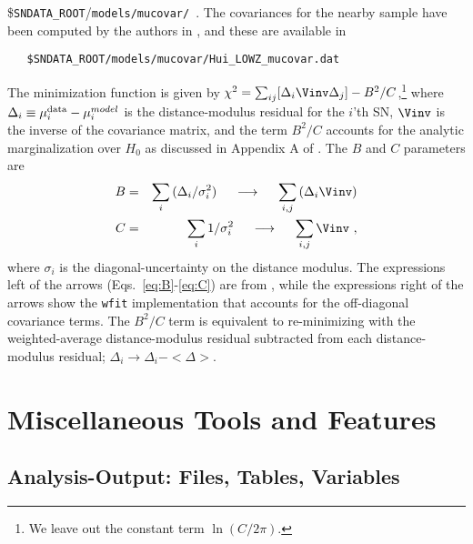 \documentclass[12pt]{article}
\newcommand{\sndataroot}{{\tt SNDATA\_ROOT}}
\begin{document}
{\$\sndataroot/{\tt models/mucovar/}~.
The covariances for the nearby sample have been computed
by the authors in \cite{Hui_06}, and these are
available in
%
\begin{verbatim}
   $SNDATA_ROOT/models/mucovar/Hui_LOWZ_mucovar.dat
\end{verbatim}
%

The minimization function is given by
$\chi^2 = \sum_{ij}[\Delta_i \Vinv\Delta_j] - B^2/C$,\footnote{
We leave out the constant term $\ln(C/2\pi)$.}
where 
$\Delta_i \equiv \mu_i^{\rm data}-\mu_i^{model}$ is the 
distance-modulus residual for the $i$'th SN, 
$\Vinv$ is the inverse of the covariance matrix,
and the term $B^2/C$ accounts for the analytic
marginalization over $H_0$ as discussed in 
Appendix A of \cite{Goliath2001}.
The $B$ and $C$ parameters are
%
\begin{eqnarray}
   B & = & \sum_i { ({\Delta_i}/{\sigma_i^2}) }
             ~~~~\longrightarrow~~~~
           \sum_{i,j} { ( \Delta_i\Vinv ) }
    \label{eq:B} \\
   C & = & \sum_i 1/{\sigma_i^2}
             ~~~~\longrightarrow~~~~
           \sum_{i,j} { \Vinv }~,
    \label{eq:C}
\end{eqnarray}
%
where $\sigma_i$ is the diagonal-uncertainty on the distance modulus.
The expressions left of the arrows (Eqs.~\ref{eq:B}-\ref{eq:C})
are from \cite{Goliath2001}, while the expressions right
of the arrows show the {\tt wfit} implementation that accounts
for the off-diagonal covariance terms.
The $B^2/C$ term is equivalent to re-minimizing with
the weighted-average distance-modulus residual subtracted
from each distance-modulus residual; 
$\Delta_i \to \Delta_i - <\Delta>$.

   \clearpage
   \section{Miscellaneous Tools and Features}
   \label{sec:tools}


  \subsection{Analysis-Output: Files, Tables, Variables }
  \label{subsec:anavar}

}
\end{document}
